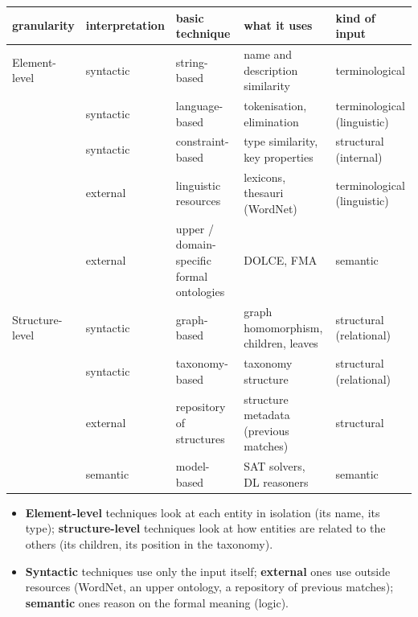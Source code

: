 \begin{center}
\footnotesize
\renewcommand{\arraystretch}{1.15}
\begin{tabularx}{\linewidth}{@{}>{\raggedright\arraybackslash}p{1.75cm}
  >{\raggedright\arraybackslash}p{1.45cm} >{\raggedright\arraybackslash}p{2.6cm}
  >{\raggedright\arraybackslash}X >{\raggedright\arraybackslash}p{2.0cm}@{}}
\toprule
\textbf{granularity} & \textbf{interpre\-tation} & \textbf{basic technique} &
  \textbf{what it uses} & \textbf{kind of input} \\
\midrule
\cellcolor{nbblue!8}Element-level & syntactic & string-based & name and description
  similarity & terminological \\
\cellcolor{nbblue!8} & syntactic & language-based & tokenisation, elimination &
  terminological (linguistic) \\
\cellcolor{nbblue!8} & syntactic & constraint-based & type similarity, key properties &
  structural (internal) \\
\cellcolor{nbblue!8} & external & linguistic resources & lexicons, thesauri (WordNet) &
  terminological (linguistic) \\
\cellcolor{nbblue!8} & external & upper / domain-specific formal ontologies & DOLCE,
  FMA & semantic \\
\midrule
\cellcolor{nborange!10}Structure-level & syntactic & graph-based & graph homomorphism,
  children, leaves & structural (relational) \\
\cellcolor{nborange!10} & syntactic & taxonomy-based & taxonomy structure & structural
  (relational) \\
\cellcolor{nborange!10} & external & repository of structures & structure metadata
  (previous matches) & structural \\
\cellcolor{nborange!10} & semantic & model-based & SAT solvers, DL reasoners &
  semantic \\
\bottomrule
\end{tabularx}
\label{fig:matching-classification}
\end{center}

\begin{itemize}[nosep]
  \item \textbf{Element-level} techniques look at each entity in isolation (its name,
        its type); \textbf{structure-level} techniques look at how entities are related
        to the others (its children, its position in the taxonomy).
  \item \textbf{Syntactic} techniques use only the input itself; \textbf{external} ones
        use outside resources (WordNet, an upper ontology, a repository of previous
        matches); \textbf{semantic} ones reason on the formal meaning (logic).
\end{itemize}

